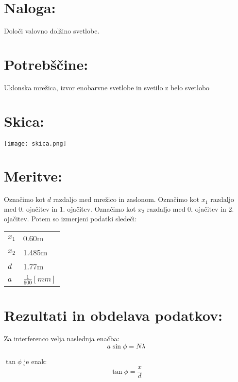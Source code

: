 \documentclass[a4paper]{article}
\begin{document}



\section*{Naloga:} %

Določi valovno dolžino svetlobe.

\section*{Potrebščine:}

Uklonska mrežica, izvor enobarvne svetlobe in svetilo z belo svetlobo

\section*{Skica:}
\begin{center}
\texttt{[image: skica.png]}
\end{center}
\section*{Meritve:}

Označimo kot $d$ razdaljo med mrežico in zaslonom. Označimo kot $x_1$ razdaljo med 0. ojačitev in 1. ojačitev. Označimo kot $x_2$ razdaljo med 0. ojačitev in 2. ojačitev. 
Potem so izmerjeni podatki sledeči:


\begin{table}[H]
   \centering
\begin{tabular}{ll}
   $x_1$ & 0.60m \\
   $x_2$ & 1.485m \\
   $d$ & 1.77m \\
   $a$ & $\frac{1}{600}[mm]$
\end{tabular}
\end{table}


\section*{Rezultati in obdelava podatkov:}

\begin{multicols}{2}
Za interferenco velja naslednja enačba:
\begin{equation}
   a\sin{\phi} = N\lambda
\end{equation}

\columnbreak

$\tan{\phi}$ je enak:
\begin{equation}
   \tan{\phi} = \frac{x}{d}
\end{equation}

\end{multicols}
\end{document}
